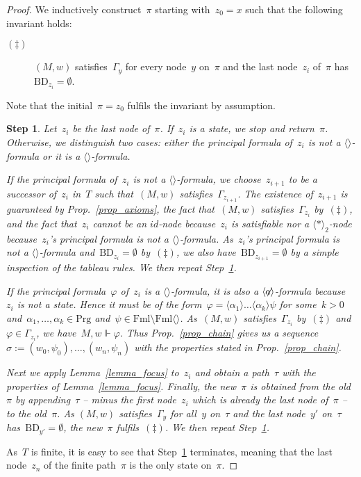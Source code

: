 \documentclass{entcs}
\newtheorem{stp}{Step}
\newenvironment{step}{\vspace{-\lastskip}\par \addvspace{.6pc
    plus .2pc minus .1pc}\begin{stp}\rm}{\end{stp}\par\addvspace{.6pc
    plus .2pc minus .1pc}}
\newcommand{\pea}[2]{\langle#1\rangle #2}
\newcommand{\prp}[1]{#1*}
\newcommand{\fml}{\mathrm{Fml}}
\newcommand{\prg}{\mathrm{Prg}}
\newcommand{\fea}{$\pea{}{}$}
\newcommand{\fean}{$\pea{\not\!\!a}{}$}
\newcommand{\fmlea}{\mathrm{Fml}\pea{}{}}
\newcommand{\psr}[2]{#1 \Vdash #2}
\newcommand{\tbdia}{\mathrm{BD}}
\newcommand{\trid}{$id$}
\newcommand{\trert}{$\pea{\prp{}}{}_2$}
\newcommand{\fchn}{\sigma}
\begin{document}
\begin{proof}
  We inductively construct~$\pi$ starting with~$z_0 = x$
  such that the following invariant holds:
  \begin{description}
  \item[$(\ddagger)$] $(M, w)$ satisfies~$\Gamma_y$ for every node~$y$ on~$\pi$
    and the last node~$z_i$ of~$\pi$ has~$\tbdia_{z_i} = \emptyset$.
  \end{description}
  Note that the initial~$\pi = z_0$ fulfils the invariant by assumption.
  \begin{step}
    \label{step_three}
    Let~$z_i$ be the last node of~$\pi$.
    If~$z_i$ is a state, we stop and return~$\pi$.
    Otherwise, we distinguish two cases:
    either the principal formula of~$z_i$ is not a \fea{}-formula
    or it is a \fea{}-formula.

    If the principal formula of~$z_i$ is not a \fea{}-formula,
    we choose~$z_{i+1}$ to be a successor of~$z_i$ in~$T$
    such that~$(M, w)$ satisfies~$\Gamma_{z_{i+1}}$.
    The existence of~$z_{i+1}$ is guaranteed by Prop.~\ref{prop_axioms},
    the fact that~$(M, w)$ satisfies~$\Gamma_{z_i}$ by~$(\ddagger)$,
    and the fact that~$z_i$ cannot be an \trid{}-node because~$z_i$ is satisfiable
    nor a \trert{}-node because~$z_i$'s principal formula is not a \fea{}-formula.
    As~$z_i$'s principal formula is not a \fea{}-formula and~$\tbdia_{z_i} = \emptyset$ by~$(\ddagger)$, 
    we also have~$\tbdia_{z_{i+1}} = \emptyset$ by a simple inspection of the tableau rules.
    We then repeat Step~\ref{step_three}.
    
    If the principal formula~$\varphi$ of~$z_i$ is a \fea{}-formula,
    it is also a \fean{}-formula because~$z_i$ is not a state.
    Hence it must be of the form~$\varphi = \pea{\alpha_1}{\dotsc \pea{\alpha_k}{\psi}}$
    for some~$k > 0$ and~$\alpha_1, \dots, \alpha_k \in \prg$ and~$\psi \in \fml \setminus \fmlea$.
    As~$(M, w)$ satisfies~$\Gamma_{z_i}$ by~$(\ddagger)$ and~$\varphi \in \Gamma_{z_i}$,
    we have~$\psr{M,w}{\varphi}$.
    Thus Prop.~\ref{prop_chain} gives us a sequence~$\fchn := (w_0, \psi_0), \dotsc, (w_n, \psi_n)$ 
    with the properties stated in Prop.~\ref{prop_chain}.

    Next we apply Lemma~\ref{lemma_focus} to~$z_i$
    and obtain a path~$\tau$ with the properties of Lemma~\ref{lemma_focus}.
    Finally,
    the new~$\pi$ is obtained from the old~$\pi$ by appending~$\tau$
    -- minus the first node~$z_i$
    which is already the last node of~$\pi$ -- to the old~$\pi$.
    As $(M, w)$ satisfies~$\Gamma_y$ for all~$y$ on~$\tau$
    and the last node~$y'$ on~$\tau$ has~$\tbdia_{y'} = \emptyset$,
    the new~$\pi$ fulfils~$(\ddagger)$.
    We then repeat Step~\ref{step_three}.
  \end{step}
  As~$T$ is finite, it is easy to see that Step~\ref{step_three} terminates,
  meaning that the last node~$z_n$ of the finite path~$\pi$ is the only state on~$\pi$.
\end{proof}
\end{document}

